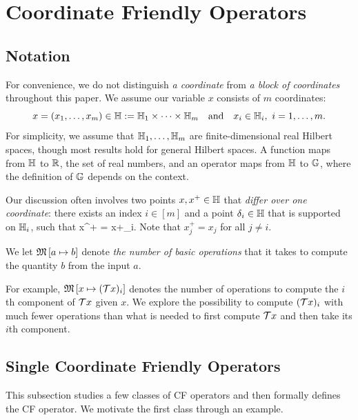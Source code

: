 \section{Coordinate Friendly Operators}\label{sec:cuf}

\subsection{Notation}
For convenience, we do not distinguish \emph{a coordinate} from \emph{a block of coordinates} throughout this paper. We assume our variable $x$ consists of $m$ coordinates: $$x = (x_1, \ldots, x_m) \in\mathbb{H} := \mathbb{H}_1 \times \cdots \times \mathbb{H}_m\quad\mbox{and}\quad x_i\in\mathbb{H}_i,~ i=1,\ldots,m.$$ For simplicity, we assume that $\mathbb{H}_1,\ldots,\mathbb{H}_m$ are finite-dimensional real Hilbert spaces, though most results hold for general Hilbert spaces.
A function maps from $\mathbb{H}$ to $\mathbb{R}$, the set of real numbers, and an operator maps from $\mathbb{H}$ to $\mathbb{G}$, where the definition of $\mathbb{G}$ depends on the context. 

Our discussion often involves two points $x,x^+\in\mathbb{H}$ that \emph{differ over one coordinate}: there exists an index $i\in [m]$ and a point $\delta_i\in\mathbb{H}$ that is supported on $\mathbb{H}_i$, such that
\beq\label{singleupdate}
x^+ = x+\delta_i.
\eeq
Note that $x^+_j=x_j$ for all $j\not=i$.
\begin{definition}
We let $\mathfrak{M}\left[{a}\mapsto {b}\right]$ denote \emph{the number of basic operations} that it takes to compute the quantity $b$ from the  input $a$.
\end{definition}
For example, $\mathfrak{M}\left[{x}\mapsto {({\mathcal{T}}x)_i}\right]$ denotes the number of operations to compute the $i$th component of ${\mathcal{T}} x$ given $x$. We explore the possibility to compute  $({\mathcal{T}} x)_i$ with much fewer operations than what is needed to first compute ${\mathcal{T}} x$ and  then take its $i$th component. %


\subsection{Single Coordinate Friendly Operators}
This subsection studies a few classes of CF operators and then formally defines the CF operator. We motivate the first class through an example.

